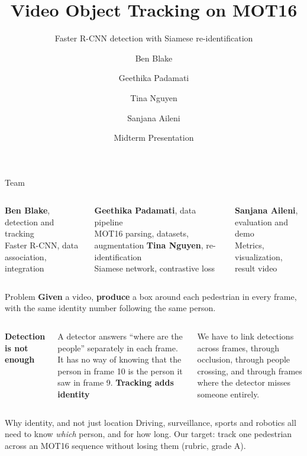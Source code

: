 \documentclass[aspectratio=169,11pt]{beamer}
\title{Video Object Tracking on MOT16}
\subtitle{Faster R-CNN detection with Siamese re-identification}
\author{Ben Blake \and Geethika Padamati \and Tina Nguyen \and Sanjana Aileni}
\institute{Group 4 \\ COMP-SCI 5567, Deep Learning \\ University of Missouri--Kansas City}
\date{Midterm Presentation}
\begin{document}
\maketitle

\begin{frame}{Team}
  \begin{columns}[T,onlytextwidth]
      \textbf{Ben Blake}, detection and tracking \\
      {\small Faster R-CNN, data association, integration}
      \vspace{0.7em}

      \textbf{Geethika Padamati}, data pipeline \\
      {\small MOT16 parsing, datasets, augmentation}
      \textbf{Tina Nguyen}, re-identification \\
      {\small Siamese network, contrastive loss}
      \vspace{0.7em}

      \textbf{Sanjana Aileni}, evaluation and demo \\
      {\small Metrics, visualization, result video}
  \end{columns}
  \vspace{1.4em}
\end{frame}

\begin{frame}{Problem}
  \textbf{Given} a video, \textbf{produce} a box around each pedestrian in every
  frame, with the \alert{same identity number} following the same person.
  \vspace{1.2em}

  \begin{columns}[T,onlytextwidth]
      \textbf{Detection is not enough}

      {\small A detector answers ``where are the people'' separately in each
      frame. It has no way of knowing that the person in frame 10 is the person
      it saw in frame 9.}
      \textbf{Tracking adds identity}

      {\small We have to link detections across frames, through occlusion,
      through people crossing, and through frames where the detector misses
      someone entirely.}
  \end{columns}
  \vspace{1.0em}

  \begin{alertblock}{Why identity, and not just location}
    {\small Driving, surveillance, sports and robotics all need to know
    \emph{which} person, and for how long. Our target: track one pedestrian
    across an MOT16 sequence without losing them (rubric, grade A).}
  \end{alertblock}
\end{frame}
\end{document}
